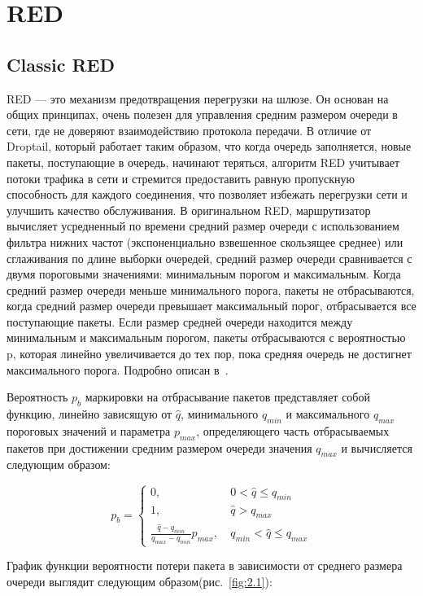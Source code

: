 \chapter{RED}

\section{Classic RED}


RED — это механизм предотвращения перегрузки на шлюзе. Он основан на общих принципах, очень полезен для управления средним размером очереди в сети, где не доверяют взаимодействию протокола передачи. В отличие от Droptail, который работает таким образом, что когда очередь заполняется, новые пакеты, поступающие в очередь, начинают теряться, алгоритм RED учитывает потоки трафика в сети и стремится предоставить равную пропускную способность для каждого соединения, что позволяет избежать перегрузки сети и улучшить качество обслуживания. В оригинальном RED, маршрутизатор вычисляет усредненный по времени средний размер очереди с использованием фильтра нижних частот (экспоненциально взвешенное скользящее среднее) или сглаживания по длине выборки очередей, средний размер очереди сравнивается с двумя пороговыми значениями: минимальным порогом и максимальным. Когда средний размер очереди меньше минимального порога, пакеты не отбрасываются, когда средний размер очереди превышает максимальный порог, отбрасывается все поступающие пакеты. Если размер средней очереди находится между минимальным и максимальным порогом, пакеты отбрасываются с вероятностью p, которая линейно увеличивается до тех пор, пока средняя очередь не достигнет максимального порога. Подробно описан в~\cite{RED1,RED2}.
 
Вероятность $p_{b}$ маркировки на отбрасывание пакетов представляет собой функцию, линейно зависящую от $\hat{q}$, минимального $q_{min}$ и максимального $q_{max}$ пороговых значений и параметра $p_{max}$, определяющего часть отбрасываемых пакетов при достижении средним размером очереди значения $q_{max}$ и вычисляется следующим образом:

$$
p_{b} = \begin{cases}
	0, &  \ 0 < \hat{q} \leq q_{min}
	\\
	1, &  \ \hat{q} > q_{max}
	\\
	\frac{\hat{q} - q_{min}}{q_{max} - q_{min}} p_{max}, & \ q_{min} < \hat{q} \leqslant q_{max} 
\end{cases}
$$					

График функции вероятности потери пакета в зависимости от среднего размера очереди выглядит следующим образом(рис.~\ref{fig:2.1}):

